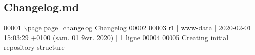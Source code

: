 \hypertarget{_changelog_8md_source}{}\subsection{Changelog.\+md}

\begin{DoxyCode}
00001 \(\backslash\)page page\_changelog Changelog
00002 
00003 r1 | www-data | 2020-02-01 15:03:29 +0100 (sam. 01 févr. 2020) | 1 ligne
00004 
00005 Creating initial repository structure
\end{DoxyCode}

